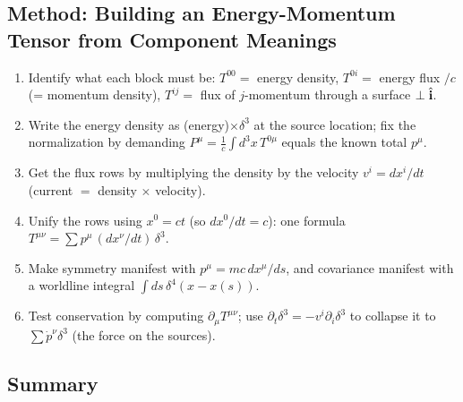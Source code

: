 \subsection*{Method: Building an Energy-Momentum Tensor from Component Meanings}
\begin{enumerate}
  \item Identify what each block must be: $T^{00}=$ energy density, $T^{0i}=$ energy
        flux $/c$ (= momentum density), $T^{ij}=$ flux of $j$-momentum through a surface
        $\perp\hat{\mathbf{i}}$.
  \item Write the energy density as (energy)$\times\delta^3$ at the source location; fix the
        normalization by demanding $P^\mu=\tfrac1c\int d^3x\,T^{0\mu}$ equals the known
        total $p^\mu$.
  \item Get the flux rows by multiplying the density by the velocity $v^i=dx^i/dt$
        (current $=$ density $\times$ velocity).
  \item Unify the rows using $x^0=ct$ (so $dx^0/dt=c$): one formula
        $T^{\mu\nu}=\sum p^\mu\,(dx^\nu/dt)\,\delta^3$.
  \item Make symmetry manifest with $p^\mu=mc\,dx^\mu/ds$, and covariance manifest with a
        worldline integral $\int ds\,\delta^4(x-x(s))$.
  \item Test conservation by computing $\partial_\mu T^{\mu\nu}$; use
        $\partial_t\delta^3=-v^i\partial_i\delta^3$ to collapse it to $\sum\dot p^\nu\delta^3$
        (the force on the sources).
\end{enumerate}

\subsection*{Summary}

